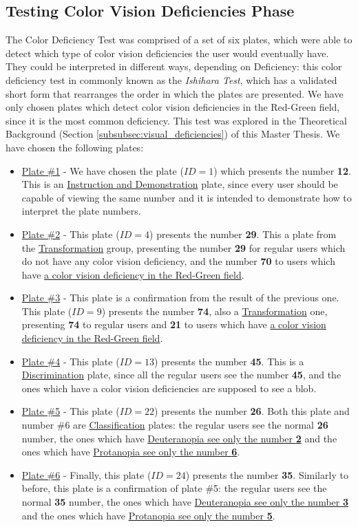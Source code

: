 \subsection{Testing Color Vision Deficiencies Phase}
\label{subsec:design_ishihara}
%
The Color Deficiency Test was comprised of a set of six plates, which were able to detect which type of color vision deficiencies the user
would eventually have. They could be interpreted in different ways, depending on Deficiency: this color deficiency test in commonly known as the
\emph{Ishihara Test}, which has a validated \cite{Alwis1992} short form that rearranges the order in which the plates are presented. We have only chosen plates
which detect color vision deficiencies in the Red-Green field, since it is the most common deficiency. This test was explored
in the Theoretical Background (Section \ref{subsubsec:visual_deficiencies}) of this Master Thesis. We have chosen the following plates:
%
\begin{itemize}
	\item \ul{Plate \#1} - We have chosen \cite{Alwis1992} the plate ($ID = 1$) which presents the number \textbf{12}. This is an \ul{Instruction and
	Demonstration} plate, since every user should be capable of viewing the same number and it is intended to demonstrate how to interpret the plate numbers.
	\item \ul{Plate \#2} - This plate ($ID = 4$) presents the number \textbf{29}. This a plate from the \ul{Transformation} group, presenting the number
	\textbf{29} for regular	users which do not have any color vision deficiency, and the number \textbf{70} to users which have \ul{a color vision
	deficiency in the Red-Green field}.
	\item \ul{Plate \#3} - This plate is a confirmation from the result of the previous one. This plate ($ID = 9$) presents the number \textbf{74}, also a
	\ul{Transformation} one, presenting \textbf{74} to regular users and \textbf{21} to users which have \ul{a color vision deficiency in the Red-Green field}.
	\item \ul{Plate \#4} - This plate ($ID = 13$) presents the number \textbf{45}. This is a \ul{Discrimination} plate, since all the regular users see the
	number \textbf{45}, and	the ones which have a color vision deficiencies are supposed to see a blob.
	\item \ul{Plate \#5} - This plate ($ID = 22$) presents the number \textbf{26}. Both this plate and number \#6 are \ul{Classification} plates: the regular users see the
	normal \textbf{26} number, the ones which have \ul{Deuteranopia see only the number \textbf{2}} and the ones which have \ul{Protanopia see only the number
	\textbf{6}}.
	\item \ul{Plate \#6} - Finally, this plate ($ID = 24$) presents the number \textbf{35}. Similarly to before, this plate is a confirmation of plate \#5: the regular users
	see the normal \textbf{35} number, the ones which have \ul{Deuteranopia see only the number \textbf{3}} and the ones which have \ul{Protanopia see
	only the number \textbf{5}}.
\end{itemize}
